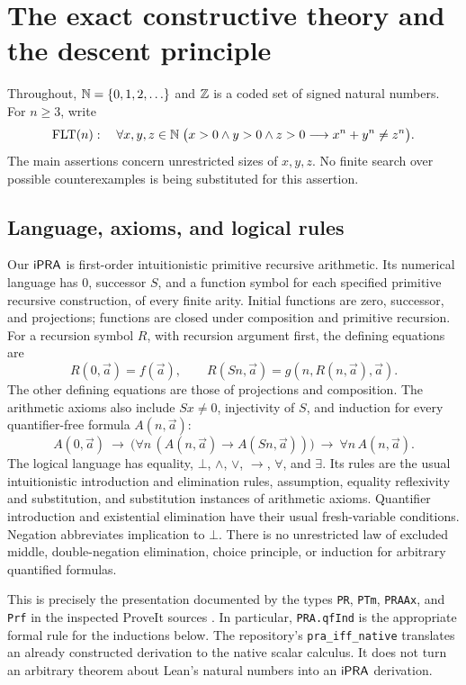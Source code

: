 \section{The exact constructive theory and the descent principle}
\label{sec:foundations}

Throughout, $\mathbb N=\{0,1,2,\ldots\}$ and $\mathbb Z$ is a coded set of signed natural
numbers. For $n\geq 3$, write
\[
 \operatorname{FLT}(n):\quad
 \forall x,y,z\in\mathbb N\;\bigl(x>0\wedge y>0\wedge z>0
       \longrightarrow x^n+y^n\ne z^n\bigr).
\]
The main assertions concern unrestricted sizes of $x,y,z$. No finite search
over possible counterexamples is being substituted for this assertion.

\subsection{Language, axioms, and logical rules}

Our $\mathsf{iPRA}$ is first-order intuitionistic primitive recursive arithmetic.
Its numerical language has $0$, successor $S$, and a function symbol for
each specified primitive recursive construction, of every finite arity.
Initial functions are zero, successor, and projections; functions are closed
under composition and primitive recursion. For a recursion symbol $R$,
with recursion argument first, the defining equations are
\[
 R(0,\vec a)=f(\vec a),\qquad
 R(Sn,\vec a)=g(n,R(n,\vec a),\vec a).
\]
The other defining equations are those of projections and composition.
The arithmetic axioms also include $Sx\ne0$, injectivity of $S$, and
induction for every quantifier-free formula $A(n,\vec a)$:
\[
 A(0,\vec a)\ \longrightarrow\
 \bigl(\forall n\,(A(n,\vec a)\longrightarrow A(Sn,\vec a))\bigr)
 \ \longrightarrow\ \forall n\,A(n,\vec a).
\]
The logical language has equality, $\bot$, $\wedge$, $\vee$, $\to$,
$\forall$, and $\exists$. Its rules are the usual intuitionistic introduction
and elimination rules, assumption, equality reflexivity and substitution,
and substitution instances of arithmetic axioms. Quantifier introduction
and existential elimination have their usual fresh-variable conditions.
Negation abbreviates implication to $\bot$. There is no unrestricted law of
excluded middle, double-negation elimination, choice principle, or
induction for arbitrary quantified formulas.

This is precisely the presentation documented by the types
\texttt{PR}, \texttt{PTm}, \texttt{PRAAx}, and \texttt{Prf} in the inspected
ProveIt sources \cite{proveit}. In particular, \texttt{PRA.qfInd} is the
appropriate formal rule for the inductions below. The repository's
\texttt{pra\_iff\_native} translates an already constructed derivation to
the native scalar calculus. It does not turn an arbitrary theorem about
Lean's natural numbers into an $\mathsf{iPRA}$ derivation.

